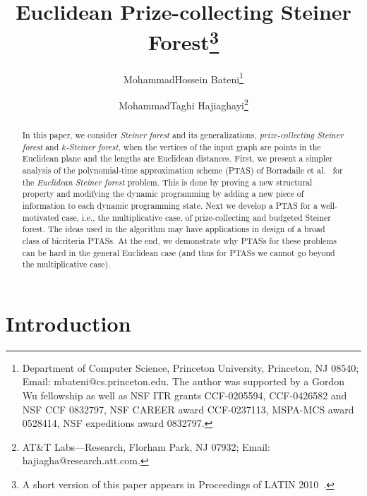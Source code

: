 \documentclass[extras,11pt]{article} \usepackage{fullpage}
\theoremstyle{mytheorem}
\begin{document}
\date{}
\title{Euclidean Prize-collecting Steiner Forest\footnote{A short version of this paper appears in Proceedings of LATIN 2010~\cite{BH10:latin}.}}



\author{MohammadHossein Bateni\thanks{Department of Computer Science, Princeton University, Princeton, NJ 08540; Email: \textsf{mbateni@cs.princeton.edu}.
The author was supported by 
a Gordon Wu fellowship as well as
NSF ITR grants
                      CCF-0205594, CCF-0426582 and NSF CCF 0832797,
                      NSF CAREER award CCF-0237113,
                      MSPA-MCS award 0528414,
                      NSF expeditions award 0832797.}
 \and MohammadTaghi Hajiaghayi\thanks{AT\&T Labs---Research, Florham Park, NJ 07932; Email: \textsf{hajiagha@research.att.com}.}}
\maketitle

\begin{abstract}
In this paper, we consider {\em Steiner forest} and its
generalizations, {\em prize-collecting Steiner forest} and {\em
$k$-Steiner forest}, when the vertices of the input graph are points
in the Euclidean plane and the lengths are Euclidean distances.
First, we present a simpler analysis of the polynomial-time
approximation scheme (PTAS) of Borradaile et
al.~\cite{BKM08:euc-for} for the {\em Euclidean Steiner
forest} problem.
This is done by proving a new structural property and
modifying the dynamic programming by adding a new piece of
information to each dynamic programming state. 
Next we develop a
PTAS for a well-motivated case, i.e., the multiplicative case, of
prize-collecting and budgeted Steiner forest.
The ideas used in the algorithm may have applications in design of a broad class of bicriteria PTASs.
At the end, we
demonstrate why PTASs for these problems can be hard in the general
 Euclidean case (and thus for PTASs we cannot go beyond the multiplicative case).
\end{abstract}
\section{Introduction}
\end{document}
